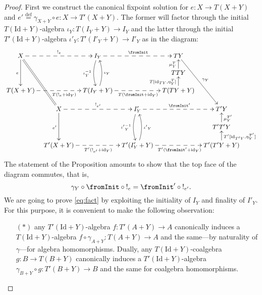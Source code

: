 \documentclass[oribibl,envcountsame,envcountsect,runningheads]{llncs}
\newcommand{\toFinal}[1]{{!_{#1}}}\DeclareMathSymbol{\fromInit}{\mathord}{operators}{"3C}
\renewcommand{\>}{\rangle}
\def\id{\mathrm{id}}
\def\Id{\mathrm{Id}}
\def\carrier{I}
\def\:{\colon}
\begin{document}
\begin{proof} First we construct the canonical fixpoint solution for $e \: X \to T(X+Y)$ and $e' \stackrel{\mathrm{def}}= \gamma_{X+Y} \circ e \colon X \to T'(X+Y)$. The former will factor through the initial $T(\Id +Y)$-algebra $\iota_Y : T(\carrier_Y+ Y) \to \carrier_Y$ and the latter through the initial $T'(\Id +Y)$-algebra ${\iota'}_Y \: T'(\carrier'_Y+ Y) \to \carrier'_Y$ as in the diagram:
\begin{equation*}\label{diag:factcanonicalSol}\small
\vcenter{
    \xymatrix@R=12pt@C=7pt{
    X \ar@{-->}[rr]^{\toFinal{e}} \ar[dd]_{e} \ar@{=}[dddr] & & \carrier_Y \ar@/_/[dd]_{\iota_Y^{-1}} \ar@{-->}[rr]^{\fromInit} & & TY \ar[dddr]^{\gamma_Y} \\
     & & & & TTY \ar[u]^{\mu^T_Y} \\
    T(X+Y)  \ar@{-->}[rr]_>>>>>>>>>{T(\toFinal{e} + \id_Y)} & & T(\carrier_Y +Y)
    \ar@/_/[uu]_{\iota_Y}
    \ar@{-->}[rr]_{T( \fromInit + \id_Y)} & & T(TY+Y) \ar[u]^{T[\id_{T Y},\eta^T_Y]}
\\
&   X \ar@{-->}[rr]^{\toFinal{e'}} \ar[dd]_{e'} & & \carrier'_Y \ar@/_/[dd]_{{\iota'}_Y^{-1}} \ar@{-->}[rr]^{\fromInit'} & & T'Y\\
     & & & & & T'T'Y \ar[u]_{\mu^{T'}_Y} \\
    & T'(X+Y)  \ar@{-->}[rr]_{T'(\toFinal{e'} + \id_Y)} & & T'(\carrier'_Y +Y)
    \ar@/_/[uu]_{{\iota'}_Y}
    \ar@{-->}[rr]_{T'( \fromInit' + \id_Y)} & & T'(T'Y+Y) \ar[u]_{T'[\id_{T' Y},\eta^{T'}_Y]}
    }
}
\end{equation*}
The statement of the Proposition amounts to show that the top face of the diagram commutes, that is,
\begin{equation}\label{eq:fact}
\gamma_Y \circ \fromInit \circ \toFinal{e} = \fromInit' \circ \toFinal{e'}.
\end{equation}
We are going to prove \eqref{eq:fact} by exploiting the initiality of $\carrier_Y$ and finality of $\carrier'_Y$. For this purpose, it is convenient to make the following observation:
\begin{itemize}
  \item[$(*)$] any $T'(\Id +Y)$-algebra $f \colon T'(A+Y) \to A$ canonically induces a $T(\Id +Y)$-algebra  $f \circ \gamma_{A+Y} \colon T(A+Y) \to A$ and the same---by naturality of $\gamma$---for algebra homomorphisms. Dually, any $T(\Id +Y)$-coalgebra $g \colon B \to T(B+Y)$ canonically induces a $T'(\Id +Y)$-algebra $\gamma_{B+Y} \circ g : T'(B+Y) \to B$ and the same for coalgebra homomorphisms.
      \begin{equation*}

\end{equation*}
\end{itemize}
\end{proof}
\end{document}
